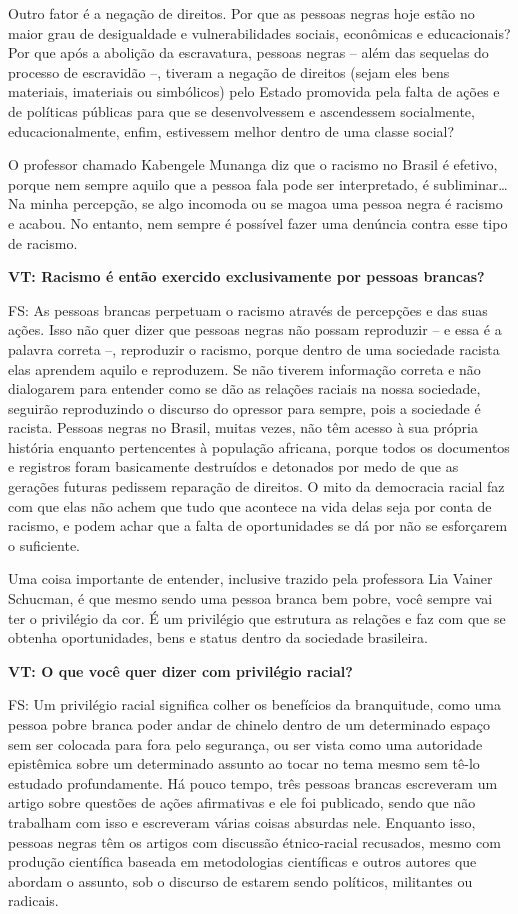 \documentclass[a4paper,
fontsize=11pt,
oneside,
numbers=noperiodatend,
parskip=half-,
bibliography=totoc,
final
]{scrartcl}
\begin{document}
Outro fator é a negação de direitos. Por que as pessoas negras hoje
estão no maior grau de desigualdade e vulnerabilidades sociais,
econômicas e educacionais? Por que após a abolição da escravatura,
pessoas negras -- além das sequelas do processo de escravidão --,
tiveram a negação de direitos (sejam eles bens materiais, imateriais ou
simbólicos) pelo Estado promovida pela falta de ações e de políticas
públicas para que se desenvolvessem e ascendessem socialmente,
educacionalmente, enfim, estivessem melhor dentro de uma classe social?

O professor chamado Kabengele Munanga diz que o racismo no Brasil é
efetivo, porque nem sempre aquilo que a pessoa fala pode ser
interpretado, é subliminar\ldots{} Na minha percepção, se algo incomoda
ou se magoa uma pessoa negra é racismo e acabou. No entanto, nem sempre
é possível fazer uma denúncia contra esse tipo de racismo.

\textbf{VT: Racismo é então exercido exclusivamente por pessoas
brancas?}

FS: As pessoas brancas perpetuam o racismo através de percepções e das
suas ações. Isso não quer dizer que pessoas negras não possam reproduzir
-- e essa é a palavra correta --, reproduzir o racismo, porque dentro de
uma sociedade racista elas aprendem aquilo e reproduzem. Se não tiverem
informação correta e não dialogarem para entender como se dão as
relações raciais na nossa sociedade, seguirão reproduzindo o discurso do
opressor para sempre, pois a sociedade é racista. Pessoas negras no
Brasil, muitas vezes, não têm acesso à sua própria história enquanto
pertencentes à população africana, porque todos os documentos e
registros foram basicamente destruídos e detonados por medo de que as
gerações futuras pedissem reparação de direitos. O mito da democracia
racial faz com que elas não achem que tudo que acontece na vida delas
seja por conta de racismo, e podem achar que a falta de oportunidades se
dá por não se esforçarem o suficiente.

Uma coisa importante de entender, inclusive trazido pela professora Lia
Vainer Schucman, é que mesmo sendo uma pessoa branca bem pobre, você
sempre vai ter o privilégio da cor. É um privilégio que estrutura as
relações e faz com que se obtenha oportunidades, bens e status dentro da
sociedade brasileira.

\textbf{VT: O que você quer dizer com privilégio racial?}

FS: Um privilégio racial significa colher os benefícios da branquitude,
como uma pessoa pobre branca poder andar de chinelo dentro de um
determinado espaço sem ser colocada para fora pelo segurança, ou ser
vista como uma autoridade epistêmica sobre um determinado assunto ao
tocar no tema mesmo sem tê-lo estudado profundamente. Há pouco tempo,
três pessoas brancas escreveram um artigo sobre questões de ações
afirmativas e ele foi publicado, sendo que não trabalham com isso e
escreveram várias coisas absurdas nele. Enquanto isso, pessoas negras
têm os artigos com discussão étnico-racial recusados, mesmo com produção
científica baseada em metodologias científicas e outros autores que
abordam o assunto, sob o discurso de estarem sendo políticos, militantes
ou radicais.
\end{document}
